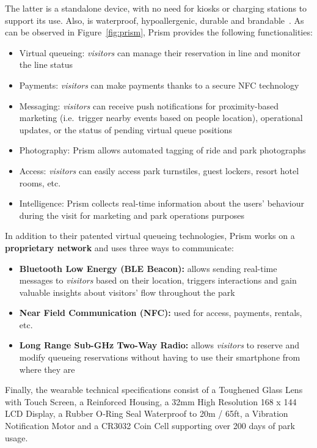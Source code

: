 The latter is a standalone device, with no need for kiosks or charging stations to support its use.
Also, is waterproof, hypoallergenic, durable and brandable~\cite{prism-desc}.
As can be observed in Figure~\ref{fig:prism}, Prism provides the following functionalities:
\begin{itemize}
    \item Virtual queueing: \textit{visitors} can manage their reservation in line and monitor the line status
    \item Payments: \textit{visitors} can make payments thanks to a secure NFC technology
    \item Messaging: \textit{visitors} can receive push notifications for proximity-based marketing (i.e.\ trigger nearby events based on people location), operational updates, or the status of pending virtual queue positions
    \item Photography: Prism allows automated tagging of ride and park photographs
    \item Access: \textit{visitors} can easily access park turnstiles, guest lockers, resort hotel rooms, etc.
    \item Intelligence: Prism collects real-time information about the users' behaviour during the visit for marketing and park operations purposes
\end{itemize}

In addition to their patented virtual queueing technologies, Prism works on a \textbf{proprietary network} and uses three ways to communicate:
\begin{itemize}
    \item \textbf{Bluetooth Low Energy (BLE Beacon):} allows sending real-time messages to \textit{visitors} based on their location, triggers interactions and gain valuable insights about visitors' flow throughout the park
    \item \textbf{Near Field Communication (NFC):} used for access, payments, rentals, etc.
    \item \textbf{Long Range Sub-GHz Two-Way Radio:} allows \textit{visitors} to reserve and modify queueing reservations without having to use their smartphone from where they are
\end{itemize}

Finally, the wearable technical specifications consist of a Toughened Glass Lens with Touch Screen, a Reinforced Housing, a 32mm High Resolution 168 x 144 LCD Display, a Rubber O‑Ring Seal Waterproof to 20m / 65ft,
a Vibration Notification Motor and a CR3032 Coin Cell supporting over 200 days of park usage.

